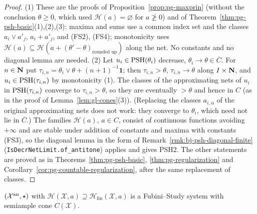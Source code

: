 \begin{proof}
(1) These are the proofs of Proposition~\ref{prop:pg-maxprin} (without the conclusion $\theta\ge0$, which used $\mathcal H(a)=\varnothing$ for
$a\not\ge0$) and of Theorem~\ref{thm:pg-psh-basic}(1),(2),(3): maxima and sums use a common index set and the classes $a_i\vee a'_j$,
$a_i+a'_j$, and (FS2), (FS4); monotonicity uses $\mathcal H(a)\subseteq\mathcal H(a+(\theta'-\theta)_{\text{rounded up}})$ along the net. No constants
and no diagonal lemma are needed. (2) Let $u_i\in\operatorname{PSH}(\theta_i)$ decrease, $\theta_i\to\theta\in\overline C$. For $n\in\mathbf{N}$ put $\tau_{i,n}=\theta_i\vee\theta+(n+1)^{-1}\mathbf 1$; then
$\tau_{i,n}>\theta$, $\tau_{i,n}\to\theta$ along $I\times\mathbf{N}$, and $u_i\in\operatorname{PSH}(\tau_{i,n})$ by monotonicity (1). The classes of the approximating nets of
$u_i$ in $\operatorname{PSH}(\tau_{i,n})$ converge to $\tau_{i,n}>\theta$, so they are eventually $>\theta$ and hence in $C$ (as in the proof of Lemma~\ref{lem:gl-cones}(3)).
(Replacing the classes $a_{i,\alpha}$ of the original approximating nets does not work: they converge to $\theta_i$, which need not lie in $\overline C$.) The families $\mathcal H(a)$, $a\in C$, consist of continuous functions avoiding $+\infty$ and are stable
under addition of constants and maxima with constants (FS3), so the diagonal lemma in the form of Remark~\ref{rmk:bj-psh-diagonal-finite}
(\texttt{IsDecrNetLimit.of\_antitone}) applies and gives PSH2. The other statements are proved as in Theorems~\ref{thm:pg-psh-basic},
\ref{thm:pg-regularization} and Corollary~\ref{cor:pg-countable-regularization}, after the same replacement of classes.
\end{proof}

\begin{lemma}\label{lem:gl-fs-system}
\leanok
{}
$(\mathcal X^{\mathrm{an}},\star)$ with $\mathcal H(\mathcal X,a)\supseteq\mathcal H_{\mathrm{fin}}(\mathcal X,a)$ is a Fubini--Study system with semiample
cone $C(\mathcal X)$.
\end{lemma}

